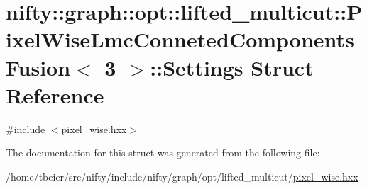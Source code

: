 \hypertarget{structnifty_1_1graph_1_1opt_1_1lifted__multicut_1_1PixelWiseLmcConnetedComponentsFusion_3_013_01_4_1_1Settings}{}\section{nifty\+:\+:graph\+:\+:opt\+:\+:lifted\+\_\+multicut\+:\+:Pixel\+Wise\+Lmc\+Conneted\+Components\+Fusion$<$ 3 $>$\+:\+:Settings Struct Reference}
\label{structnifty_1_1graph_1_1opt_1_1lifted__multicut_1_1PixelWiseLmcConnetedComponentsFusion_3_013_01_4_1_1Settings}


{\ttfamily \#include $<$pixel\+\_\+wise.\+hxx$>$}



The documentation for this struct was generated from the following file\+:\begin{DoxyCompactItemize}
\item 
/home/tbeier/src/nifty/include/nifty/graph/opt/lifted\+\_\+multicut/\hyperlink{pixel__wise_8hxx}{pixel\+\_\+wise.\+hxx}\end{DoxyCompactItemize}
